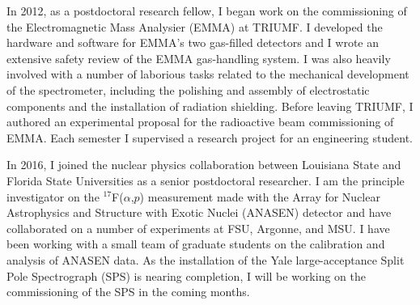 {In %
 2012, as a postdoctoral research fellow, I began work on the commissioning of the Electromagnetic Mass Analysier (EMMA) %
 at TRIUMF. %
 I developed the hardware and software for 
 EMMA's two gas-filled detectors
and I wrote an extensive safety review of the EMMA gas-handling system. I was also heavily involved with a number of laborious tasks related to the mechanical development of the spectrometer, including the polishing and assembly of  electrostatic components and the installation of radiation shielding.
		Before leaving TRIUMF, I authored an experimental proposal for the radioactive beam commissioning of EMMA. Each semester I supervised a research project for an engineering student.
		
		
		In 2016, I joined the nuclear physics collaboration between Louisiana State and Florida State Universities as a senior postdoctoral researcher. I am the principle investigator on the $^{17}$F($\alpha$,$p$)  measurement made with the Array for Nuclear Astrophysics and Structure with Exotic Nuclei (ANASEN) detector and have collaborated on a number of experiments at FSU, Argonne, and MSU. I have been working with a small team of graduate students on the calibration and analysis of ANASEN data. As the installation of the Yale large-acceptance Split Pole Spectrograph (SPS) is nearing completion, I will be working on the commissioning of the SPS in the coming months.


}

